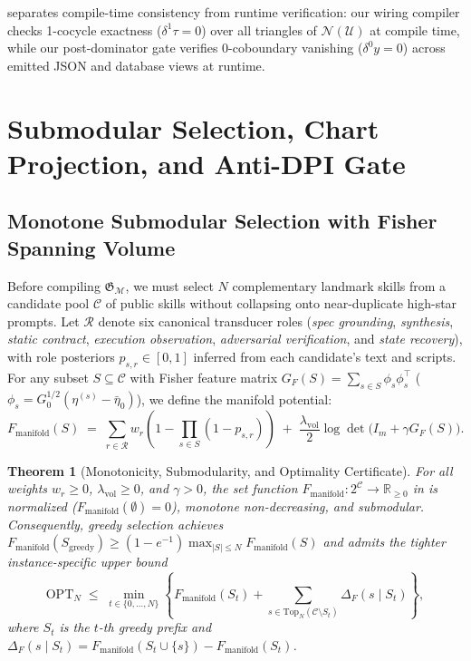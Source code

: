 \documentclass[11pt]{article}
\theoremstyle{definition}
\theoremstyle{plain}
\newtheorem{theorem}{Theorem}
\newcommand{\Ucal}{\mathcal{U}}
\newcommand{\Mcal}{\mathcal{M}}
\newcommand{\Ncal}{\mathcal{N}}
\newcommand{\Gfrak}{\mathfrak{G}}
\newcommand{\Rbb}{\mathbb{R}}
\begin{document}
 separates compile-time consistency from runtime verification: our wiring compiler checks 1-cocycle exactness ($\delta^1 \tau = 0$) over all triangles of $\Ncal(\Ucal)$ at compile time, while our post-dominator gate verifies 0-coboundary vanishing ($\delta^0 y = 0$) across emitted JSON and database views at runtime.

\section{Submodular Selection, Chart Projection, and Anti-DPI Gate}
\label{sec:selection}

\subsection{Monotone Submodular Selection with Fisher Spanning Volume}
\label{subsec:submodular}

Before compiling $\Gfrak_{\Mcal}$, we must select $N$ complementary landmark skills from a candidate pool $\mathcal{C}$ of public skills without collapsing onto near-duplicate high-star prompts. Let $\mathcal{R}$ denote six canonical transducer roles (\emph{spec grounding}, \emph{synthesis}, \emph{static contract}, \emph{execution observation}, \emph{adversarial verification}, and \emph{state recovery}), with role posteriors $p_{s,r} \in [0, 1]$ inferred from each candidate's text and scripts. For any subset $S \subseteq \mathcal{C}$ with Fisher feature matrix $G_F(S) = \sum_{s \in S} \phi_s \phi_s^\top$ ($\phi_s = G_0^{1/2}(\eta^{(s)} - \bar{\eta}_0)$), we define the manifold potential:
\begin{equation}
  F_{\mathrm{manifold}}(S) \;=\; \sum_{r \in \mathcal{R}} w_r \!\left(1 - \prod_{s \in S}(1 - p_{s,r})\right)
  \;+\; \frac{\lambda_{\mathrm{vol}}}{2} \log\det\!\bigl(I_m + \gamma G_F(S)\bigr).
  \label{eq:submodular}
\end{equation}

\begin{theorem}[Monotonicity, Submodularity, and Optimality Certificate]
\label{thm:submodular}
For all weights $w_r \ge 0$, $\lambda_{\mathrm{vol}} \ge 0$, and $\gamma > 0$, the set function $F_{\mathrm{manifold}} : 2^{\mathcal{C}} \to \Rbb_{\ge 0}$ in  is normalized ($F_{\mathrm{manifold}}(\emptyset) = 0$), monotone non-decreasing, and submodular. Consequently, greedy selection achieves $F_{\mathrm{manifold}}(S_{\mathrm{greedy}}) \ge (1 - e^{-1}) \max_{|S| \le N} F_{\mathrm{manifold}}(S)$ \citep{nemhauser1978analysis} and admits the tighter instance-specific upper bound
\begin{equation}
  \mathrm{OPT}_N \;\le\; \min_{t \in \{0,\dots,N\}} \!\left\{ F_{\mathrm{manifold}}(S_t) + \sum_{s \in \mathrm{Top}_N(\mathcal{C} \setminus S_t)} \Delta_F(s \mid S_t) \right\},
  \label{eq:online-bound}
\end{equation}
where $S_t$ is the $t$-th greedy prefix and $\Delta_F(s \mid S_t) = F_{\mathrm{manifold}}(S_t \cup \{s\}) - F_{\mathrm{manifold}}(S_t)$.
\end{theorem}
\end{document}
